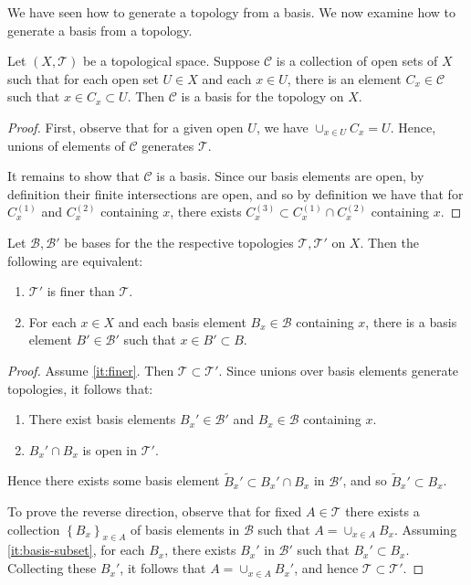 We have seen how to generate a topology from a basis. We now examine how to
generate a basis from a topology.
\begin{theorem}
	\label{thm:basis-from-top}
	Let $(X, \mathcal{T})$ be a topological space. Suppose $\mathcal{C}$ is a collection of
	open sets of $X$ such that for each open set $U \in X$ and each
	$x \in U$, there is an element $C_{x} \in \mathcal{C}$ such
	that $x \in C_{x}
	\subset U$. Then $\mathcal{C}$ is a basis for the topology on $X$.
\end{theorem}
\begin{proof}
	First, observe that for a given open $U$, we have
	$\cup_{x \in U}C_{x} = U$. Hence, unions of elements of $\mathcal{C}$
	generates $\mathcal{T}$.

	It remains to show that $\mathcal{C}$ is a basis.
	Since our basis elements are open, by definition their finite intersections
	are open, and so by definition we have that for $C_{x}^{(1)}$ and
	$C_{x}^{(2)}$ containing $x$, there exists $C_{x}^{(3)} \subset
	C_{x}^{(1)} \cap C_{x}^{(2)}$ containing $x$.
\end{proof}
\begin{lemma}
	\label{lem:finer-coarser-basis}
	Let $\mathcal{B}, \mathcal{B'}$ be bases for the the respective topologies
	$\mathcal{T}, \mathcal{T'}$ on $X$. Then the following are equivalent:
	\begin{enumerate}
		\item\label{it:finer} $\mathcal{T'}$ is finer than $\mathcal{T}$.
		\item\label{it:basis-subset} For each $x \in X$ and each basis element $B_{x} \in \mathcal{B}$
			containing $x$, there is a basis element $B' \in \mathcal{B'}$ such that
			$x \in B' \subset B$.
	\end{enumerate}
\end{lemma}
\begin{proof}
	Assume \cref{it:finer}. Then $\mathcal{T} \subset \mathcal{T'}$.
	Since unions over basis elements generate topologies,
	it follows that:
	\begin{enumerate}
		\item There exist basis elements $B_{x}' \in \mathcal{B'}$ and
			$B_{x} \in \mathcal{B}$ containing $x$.
		\item $B_{x}' \cap B_{x}$ is open in $\mathcal{T'}$.
	\end{enumerate}
	Hence there exists some basis
	element $\tilde{B}_{x}' \subset B_{x}' \cap B_{x}$ in $\mathcal{B'}$, and so
	$\tilde{B}_{x}' \subset B_{x}$.

	To prove the reverse direction, observe that for fixed $A \in \mathcal{T}$ there exists a collection $\left\{ B_{x} \right\}_{x \in A}$ of basis elements in $\mathcal{B}$ such that $A = \cup_{x
	\in A} B_{x}$.
	Assuming \cref{it:basis-subset}, for each $B_{x}$, there exists $B_{x}'$ in $\mathcal{B'}$ such that $B_{x}' \subset B_{x}$.
	Collecting these $B_{x}'$, it follows that $A = \cup_{x \in A} B_{x}'$, and hence
	$\mathcal{T} \subset \mathcal{T'}$.
\end{proof}
